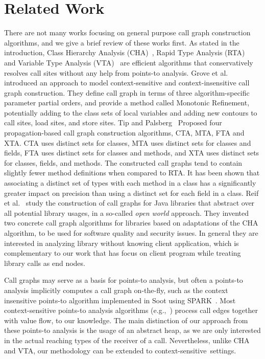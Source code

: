 \documentclass{fac}
\begin{document}
\section{Related Work}\label{sec:related-work}
There are not many works focusing on general purpose call graph construction algorithms, and we give a brief review of these works first.
%
As stated in the introduction, Class Hierarchy Analysis (CHA)~\cite{Dean1995,Fernandez1995}, Rapid Type Analysis (RTA)~\cite{Bacon1996} and Variable Type Analysis (VTA)~\cite{Sundaresan2000} are efficient algorithms that conservatively resolves call sites without any help from points-to analysis. Grove et al.~\cite{Grove1997} introduced an approach to model context-sensitive and context-insensitive call graph construction. They define call graph in terms of three algorithm-specific parameter partial orders, and provide a method called Monotonic Refinement, potentially adding to the class sets of local variables and adding new contours to call sites, load sites, and store sites.
%
Tip and Palsberg~\cite{Tip2000} Proposed four propagation-based call graph construction algorithms, CTA, MTA, FTA and XTA. CTA uses distinct sets for classes, MTA uses distinct sets for classes and fields, FTA uses distinct sets for classes and methods, and XTA uses distinct
sets for classes, fields, and methods. The constructed call graphs tend to contain slightly fewer method definitions when compared to RTA. It has been shown that associating a distinct set of types with each method in a class has a significantly greater impact on precision than using a distinct set for each field in a class. Reif et al.~\cite{Reif2016} study the construction of call graphs for Java libraries that abstract over all potential library usages, in a so-called \emph{open world} approach. They invented two concrete call graph algorithms for libraries based on adaptations of the CHA algorithm, to be used for software quality and security issues. In general they are interested in analyzing library without knowing client application, which is complementary to our work that has focus on client program while treating library calls as end nodes.

Call graphs may serve as a basis for points-to analysis, but often a points-to analysis implicitly computes a call graph on-the-fly, such as the context insensitive points-to algorithm implemented in Soot using SPARK~\cite{Lhotak2003}. Most context-sensitive points-to analysis algorithms (e.g.,~\cite{Milanova2005,Sridharan2006,Smaragdakis11,Tan16}) process call edges together with value flow, to our knowledge. The main distinction of our approach from these points-to analysis is the usage of an abstract heap, as we are only interested in the actual reaching types of the receiver of a call. Nevertheless, unlike CHA and VTA, our methodology can be extended to context-sensitive~settings.
\end{document}
